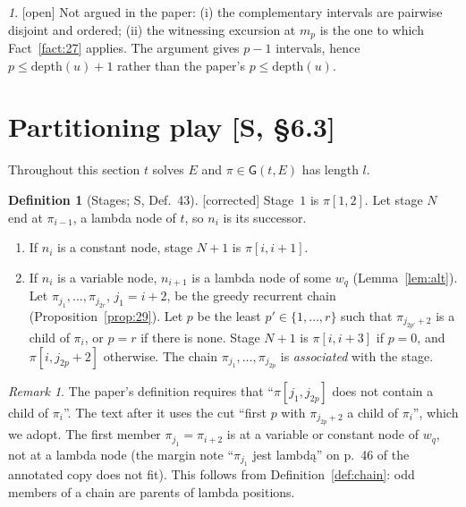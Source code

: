 \documentclass[11pt]{article}
\newcommand{\depth}{\mathrm{depth}}
\newcommand{\Gm}{\mathsf{G}}
\newcommand{\iv}[2]{\pi[#1,#2]}
\newcommand{\Fixed}{\textsf{[corrected]}}
\newcommand{\Open}{\textsf{\color{red!60!black}[open]}}
\theoremstyle{plain}
\theoremstyle{definition}
\newtheorem{definition}[theorem]{Definition}
\theoremstyle{remark}
\newtheorem{remark}[theorem]{Remark}
\newtheorem*{gapenv}{\gapname}
\newcommand{\gapname}{Gap}
\begin{document}
\renewcommand{\gapname}{[Gap-Stacking]}
\begin{gapenv}\label{gap:stacking}
\Open{} Not argued in the paper: (i) the complementary intervals are
pairwise disjoint and ordered; (ii) the witnessing excursion at $m_p$
is the one to which Fact~\ref{fact:27} applies.  The argument gives
$p-1$ intervals, hence $p\le\depth(u)+1$ rather than the paper's
$p\le\depth(u)$.
\end{gapenv}

\section{Partitioning play [S, \S6.3]}\label{sec:partition}

Throughout this section $t$ solves $E$ and $\pi\in\Gm(t,E)$ has length
$l$.

\begin{definition}[Stages; S, Def.~43]\label{def:stages}
\Fixed{} Stage~$1$ is $\iv12$.  Let stage $N$ end at $\pi_{i-1}$, a
lambda node of $t$, so $n_i$ is its successor.
\begin{enumerate}
\item If $n_i$ is a constant node, stage $N+1$ is $\iv i{i+1}$.
\item If $n_i$ is a variable node, $n_{i+1}$ is a lambda node of some
  $w_q$ (Lemma~\ref{lem:alt}).  Let $\pi_{j_1},\dots,\pi_{j_{2r}}$,
  $j_1=i+2$, be the greedy recurrent chain
  (Proposition~\ref{prop:29}).  Let $p$ be the least $p'\in\{1,\dots,r\}$
  such that $\pi_{j_{2p'}+2}$ is a child of $\pi_i$, or $p=r$ if there is
  none.  Stage $N+1$ is $\iv i{i+3}$ if $p=0$, and $\iv i{j_{2p}+2}$
  otherwise.  The chain $\pi_{j_1},\dots,\pi_{j_{2p}}$ is
  \emph{associated} with the stage.
\end{enumerate}
\end{definition}

\begin{remark}
The paper's definition requires that ``$\iv{j_1}{j_{2p}}$ does not
contain a child of $\pi_i$''.  The text after it uses the cut ``first
$p$ with $\pi_{j_{2p}+2}$ a child of $\pi_i$'', which we adopt.  The
first member $\pi_{j_1}=\pi_{i+2}$ is at a variable or constant node of
$w_q$, not at a lambda node (the margin note ``$\pi_{j_1}$ jest
lambd\k{a}'' on p.~46 of the annotated copy does not fit).  This follows
from Definition~\ref{def:chain}: odd members of a chain are parents of
lambda positions.
\end{remark}
\end{document}
